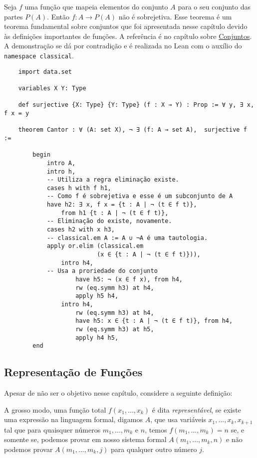 \begin{example}
    \label{cantor}
    Seja $f$ uma função que mapeia elementos do conjunto $A$ para o seu
    conjunto das partes $P(A)$. Então $f: A \to P(A)$ não é sobrejetiva. Esse
    teorema é um teorema fundamental sobre conjuntos que foi apresentada nesse
    capítulo devido às definições importantes de funções. A referência é no
    capítulo sobre \hyperlink{chapter.5}{Conjuntos}. A demonstração se dá por
    contradição e é realizada no Lean com o auxílio do 
    \lstinline{namespace classical}. 

    \begin{lstlisting}
    import data.set

    variables X Y: Type 
    
    def surjective {X: Type} {Y: Type} (f : X → Y) : Prop := ∀ y, ∃ x, f x = y
    
    theorem Cantor : ∀ (A: set X), ¬ ∃ (f: A → set A),  surjective f :=
    
        begin
            intro A,
            intro h,
            -- Utiliza a regra eliminação existe.
            cases h with f h1,
            -- Como f é sobrejetiva e esse é um subconjunto de A            
            have h2: ∃ x, f x = {t : A | ¬ (t ∈ f t)},  
                from h1 {t : A | ¬ (t ∈ f t)},
            -- Eliminação do existe, novamente. 
            cases h2 with x h3,
            -- classical.em A := A ∪ ¬A é uma tautologia. 
            apply or.elim (classical.em 
                          (x ∈ {t : A | ¬ (t ∈ f t)})),
                intro h4,
            -- Usa a proriedade do conjunto
                    have h5: ¬ (x ∈ f x), from h4,
                    rw (eq.symm h3) at h4, 
                    apply h5 h4,
                intro h4,
                    rw (eq.symm h3) at h4,
                    have h5: x ∈ {t : A | ¬ (t ∈ f t)}, from h4,
                    rw (eq.symm h3) at h5,
                    apply h4 h5,                     
        end   
    \end{lstlisting}
\end{example}

\subsection{Representação de Funções}

Apesar de não ser o objetivo nesse capítulo, considere a seguinte definição: 

\begin{definition}
    \label{represent}
    A grosso modo, uma função total $f(x_1, ..., x_k)$ é dita
    \textit{representável}, se existe uma expressão na linguagem formal,
    digamos $A$, que usa variáveis $x_1, ..., x_k, x_{k+1}$ tal que para
    quaisquer números $m_1,...,m_k$ e $n$, temos $f(m_1,...,m_k) = n$ se, e
    somente se, podemos provar em nosso sistema formal $A(m_1,...,m_k,n)$ e
    não podemos provar $A(m_1,...,m_k,j)$ para qualquer outro número $j$.
\end{definition}

